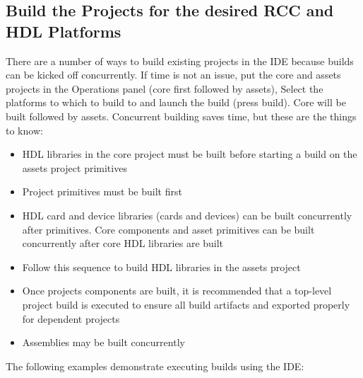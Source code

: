 \documentclass[10pt, a4paper, oneside]{article}
\begin{document}
\subsection{Build the Projects for the desired RCC and HDL Platforms}
There are a number of ways to build existing projects in the IDE because builds can be kicked off concurrently. If time is not an issue, put the core and assets projects in the Operations panel (core first followed by assets), Select the platforms to which to build to and launch the build (press build). Core will be built followed by assets.
Concurrent building saves time, but these are the things to know:
\begin{itemize}
\item	HDL libraries in the core project must be built before starting a build on the assets project primitives
\item	Project primitives must be built first
\item	HDL card and device libraries (cards and devices) can be built concurrently after primitives. Core components and asset primitives can be built concurrently after core HDL libraries are built
\item	Follow this sequence to build HDL libraries in the assets project
\item	Once projects components are built, it is recommended that a top-level project build is executed to ensure all build artifacts and exported properly for dependent projects
\item	Assemblies may be built concurrently
\end{itemize}
The following examples demonstrate executing builds using the IDE:
\end{document}
